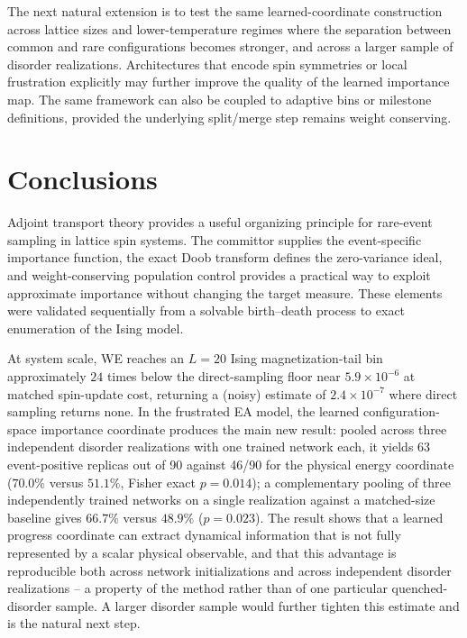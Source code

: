 \documentclass[a4paper,fleqn]{cas-sc}
\begin{document}
The next natural extension is to test the same learned-coordinate construction across lattice
sizes and lower-temperature regimes where the separation between common and rare configurations
becomes stronger, and across a larger sample of disorder realizations. Architectures that encode
spin symmetries or local frustration explicitly may further improve the quality of the learned
importance map. The same framework can also be coupled to adaptive bins or milestone definitions,
provided the underlying split/merge step remains weight conserving.

\FloatBarrier

\section{Conclusions}\label{sec:conclusions}
Adjoint transport theory provides a useful organizing principle for rare-event sampling in lattice
spin systems. The committor supplies the event-specific importance function, the exact Doob
transform defines the zero-variance ideal, and weight-conserving population control provides a
practical way to exploit approximate importance without changing the target measure. These
elements were validated sequentially from a solvable birth--death process to exact enumeration of
the Ising model.

At system scale, WE reaches an $L=20$ Ising magnetization-tail bin approximately $24$ times
below the direct-sampling floor near $5.9\times10^{-6}$ at matched spin-update cost, returning a
(noisy) estimate of $2.4\times10^{-7}$ where direct sampling returns none. In the frustrated
EA model, the learned configuration-space importance coordinate produces the main new result:
pooled across three independent disorder realizations with one trained network each, it yields
63 event-positive replicas out of 90 against 46/90 for the physical energy coordinate
($70.0\%$ versus $51.1\%$, Fisher exact $p=0.014$); a complementary pooling of three
independently trained networks on a single realization against a matched-size baseline gives
$66.7\%$ versus $48.9\%$ ($p=0.023$). The result shows that a learned progress coordinate can
extract dynamical information that is not fully represented by a scalar physical observable, and
that this advantage is reproducible both across network initializations and across independent
disorder realizations -- a property of the method rather than of one particular quenched-disorder
sample. A larger disorder sample would further tighten this estimate and is the natural next
step.
\end{document}
